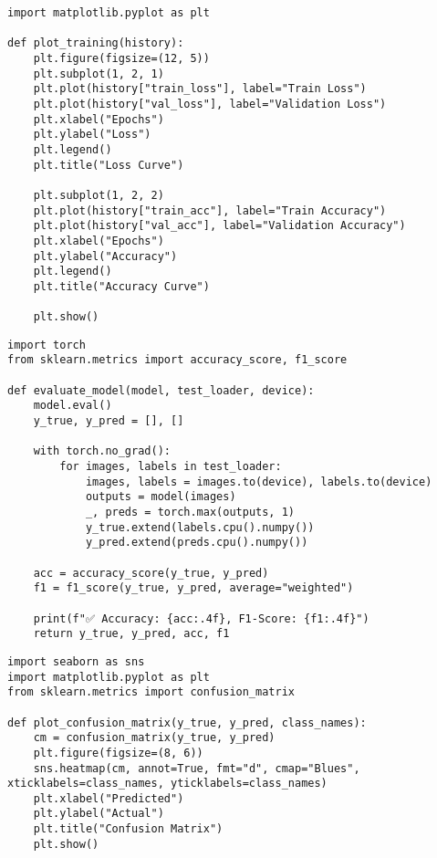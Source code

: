 \begin{verbatim}
import matplotlib.pyplot as plt

def plot_training(history):
    plt.figure(figsize=(12, 5))
    plt.subplot(1, 2, 1)
    plt.plot(history["train_loss"], label="Train Loss")
    plt.plot(history["val_loss"], label="Validation Loss")
    plt.xlabel("Epochs")
    plt.ylabel("Loss")
    plt.legend()
    plt.title("Loss Curve")

    plt.subplot(1, 2, 2)
    plt.plot(history["train_acc"], label="Train Accuracy")
    plt.plot(history["val_acc"], label="Validation Accuracy")
    plt.xlabel("Epochs")
    plt.ylabel("Accuracy")
    plt.legend()
    plt.title("Accuracy Curve")

    plt.show()

\end{verbatim}

\begin{verbatim}
import torch
from sklearn.metrics import accuracy_score, f1_score

def evaluate_model(model, test_loader, device):
    model.eval()
    y_true, y_pred = [], []

    with torch.no_grad():
        for images, labels in test_loader:
            images, labels = images.to(device), labels.to(device)
            outputs = model(images)
            _, preds = torch.max(outputs, 1)
            y_true.extend(labels.cpu().numpy())
            y_pred.extend(preds.cpu().numpy())

    acc = accuracy_score(y_true, y_pred)
    f1 = f1_score(y_true, y_pred, average="weighted")

    print(f"✅ Accuracy: {acc:.4f}, F1-Score: {f1:.4f}")
    return y_true, y_pred, acc, f1

\end{verbatim}

\begin{verbatim}
import seaborn as sns
import matplotlib.pyplot as plt
from sklearn.metrics import confusion_matrix

def plot_confusion_matrix(y_true, y_pred, class_names):
    cm = confusion_matrix(y_true, y_pred)
    plt.figure(figsize=(8, 6))
    sns.heatmap(cm, annot=True, fmt="d", cmap="Blues", xticklabels=class_names, yticklabels=class_names)
    plt.xlabel("Predicted")
    plt.ylabel("Actual")
    plt.title("Confusion Matrix")
    plt.show()

\end{verbatim}

